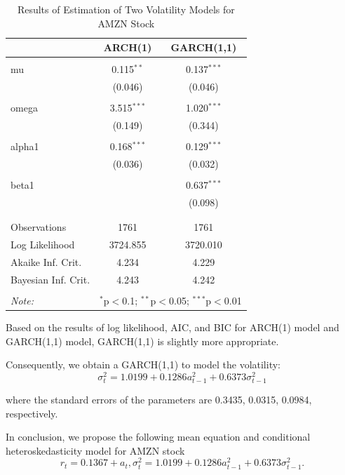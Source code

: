 \documentclass[paper=a4, fontsize=13pt]{article}
\begin{document}
\begin{table}[!htbp] \centering 
  \caption{Results of Estimation of Two Volatility Models for AMZN Stock} 
  \label{} 
\begin{tabular}{@{\extracolsep{5pt}}lcc} 
\\[-1.8ex]\hline 
\hline
 & ARCH(1) & GARCH(1,1) \\ 
\hline \\[-1.8ex] 
 mu & 0.115$^{**}$ & 0.137$^{***}$ \\ 
  & (0.046) & (0.046) \\ 
  & & \\ 
 omega & 3.515$^{***}$ & 1.020$^{***}$ \\ 
  & (0.149) & (0.344) \\ 
  & & \\ 
 alpha1 & 0.168$^{***}$ & 0.129$^{***}$ \\ 
  & (0.036) & (0.032) \\ 
  & & \\ 
 beta1 &  & 0.637$^{***}$ \\ 
  &  & (0.098) \\ 
  & & \\ 
\hline \\[-1.8ex] 
Observations & 1761 & 1761 \\ 
Log Likelihood & 3724.855 & 3720.010 \\ 
Akaike Inf. Crit. & 4.234 & 4.229 \\ 
Bayesian Inf. Crit. & 4.243 & 4.242 \\ 
\hline 
\hline \\[-1.8ex] 
\textit{Note:}  & \multicolumn{2}{r}{$^{*}$p$<$0.1; $^{**}$p$<$0.05; $^{***}$p$<$0.01} \\ 
\end{tabular} 
\end{table} 

Based on the results of log likelihood, AIC, and BIC for ARCH(1) model and GARCH(1,1) model, GARCH(1,1) is slightly more appropriate.

Consequently, we obtain a GARCH(1,1) to model the volatility:
\[ \sigma_t^2 = 1.0199+0.1286 a_{t-1}^2+0.6373\sigma_{t-1}^2 \]

where the standard errors of the parameters are 0.3435, 0.0315, 0.0984, respectively.

In conclusion, we propose the following mean equation and conditional heteroskedasticity model for AMZN stock
\[ r_t = 0.1367+a_t, \sigma_t^2 = 1.0199+0.1286a_{t-1}^2+0.6373\sigma_{t-1}^2. \]
\end{document}
